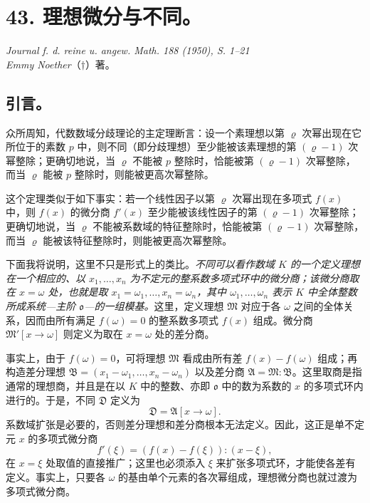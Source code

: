 \section*{43. 理想微分与不同。}

\begin{center}
\emph{Journal f. d. reine u. angew. Math. 188 (1950), S. 1--21}\\[0.75ex]
\emph{Emmy Noether}（\(\dagger\)）著。
\end{center}


\subsection*{引言。}

众所周知，代数数域分歧理论的主定理断言：设一个素理想以第 \(\varrho\) 次幂出现在它所位于的素数 \(p\) 中，则不同（即分歧理想）至少能被该素理想的第 \((\varrho-1)\) 次幂整除；更确切地说，当 \(\varrho\) 不能被 \(p\) 整除时，恰能被第 \((\varrho-1)\) 次幂整除，而当 \(\varrho\) 能被 \(p\) 整除时，则能被更高次幂整除。

这个定理类似于如下事实：若一个线性因子以第 \(\varrho\) 次幂出现在多项式 \(f(x)\) 中，则 \(f(x)\) 的微分商 \(f'(x)\) 至少能被该线性因子的第 \((\varrho-1)\) 次幂整除；更确切地说，当 \(\varrho\) 不能被系数域的特征整除时，恰能被第 \((\varrho-1)\) 次幂整除，而当 \(\varrho\) 能被该特征整除时，则能被更高次幂整除。

下面我将说明，这里不只是形式上的类比。\emph{不同可以看作数域 \(K\) 的一个定义理想在一个相应的、以 \(x_1,\ldots,x_n\) 为不定元的整系数多项式环中的微分商；该微分商取在 \(x=\omega\) 处，也就是取 \(x_1=\omega_1,\ldots,x_n=\omega_n\)，其中 \(\omega_1,\ldots,\omega_n\) 表示 \(K\) 中全体整数所成系统---主阶 \(\mathfrak o\)---的一组模基。}这里，定义理想 \(\mathfrak M\) 对应于各 \(\omega\) 之间的全体关系，因而由所有满足 \(f(\omega)=0\) 的整系数多项式 \(f(x)\) 组成。微分商 \(\mathfrak M'[x\to\omega]\) 则定义为取在 \(x=\omega\) 处的差分商。

事实上，由于 \(f(\omega)=0\)，可将理想 \(\mathfrak M\) 看成由所有差 \(f(x)-f(\omega)\) 组成；再构造差分理想 \(\mathfrak B=(x_1-\omega_1,\ldots,x_n-\omega_n)\) 以及差分商 \(\mathfrak A=\mathfrak M:\mathfrak B\)。这里取商是指通常的理想商，并且是在以 \(K\) 中的整数、亦即 \(\mathfrak o\) 中的数为系数的 \(x\) 的多项式环内进行的。于是，不同 \(\mathfrak D\) 定义为
\[
\mathfrak D=\mathfrak A[x\to\omega].
\]
系数域扩张是必要的，否则差分理想和差分商根本无法定义。因此，这正是单不定元 \(x\) 的多项式微分商
\[
f'(\xi)=(f(x)-f(\xi)):(x-\xi),
\]
在 \(x=\xi\) 处取值的直接推广；这里也必须添入 \(\xi\) 来扩张多项式环，才能使各差有定义。事实上，只要各 \(\omega\) 的基由单个元素的各次幂组成，理想微分商也就过渡为多项式微分商。

